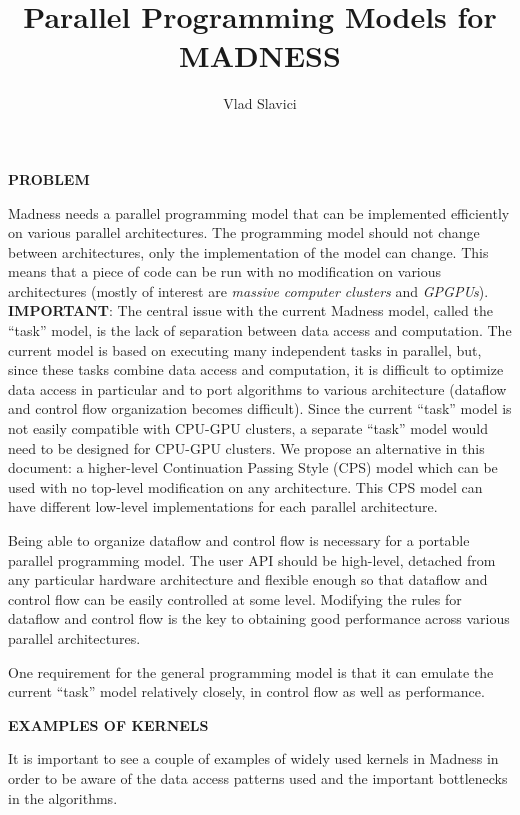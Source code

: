 \documentclass{article}
\title{Parallel Programming Models for MADNESS}
\author{Vlad Slavici}
\date{}
\begin{document}
\maketitle

\parindent=0pt

{\bf PROBLEM} 

Madness needs a parallel programming model that can be implemented efficiently
on various parallel architectures. The programming model should not change
between architectures, only the implementation of the model can change.  This
means that a piece of code can be run with no modification on various
architectures (mostly of interest are {\em massive computer clusters} and {\em
GPGPUs}).\\

{\bf IMPORTANT}: The central issue with the current Madness model, called the
``task'' model, is the lack of separation between data access and computation.
The current model is based on executing many independent tasks in parallel,
but, since these tasks combine data access and computation, it is difficult to
optimize data access in particular and to port algorithms to various
architecture (dataflow and control flow organization becomes difficult).  Since
the current ``task'' model is not easily compatible with CPU-GPU clusters, a
separate ``task'' model would need to be designed for CPU-GPU clusters.  We
propose an alternative in this document: a higher-level Continuation Passing
Style (CPS) model which can be used with no top-level modification on any
architecture. This CPS model can have  different low-level implementations for
each parallel architecture. 

Being able to organize dataflow and control flow is necessary for a portable
parallel programming model. The user API should be high-level, detached from
any particular hardware architecture and flexible enough so that dataflow and
control flow can be easily controlled at some level. Modifying the rules for
dataflow and control flow is the key to obtaining good performance across
various parallel architectures.

One requirement for the general programming model is that it can emulate the
current ``task'' model relatively closely, in control flow as well as
performance. 

{\bf EXAMPLES OF KERNELS}

It is important to see a couple of examples of widely used kernels
in Madness in order to be aware of the data access patterns used and
the important bottlenecks in the algorithms.
\end{document}
